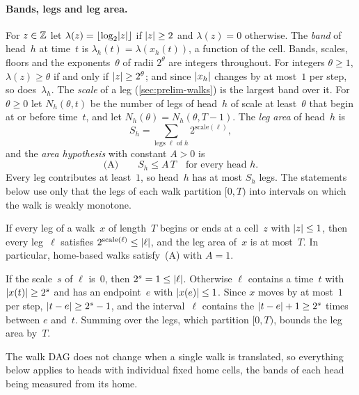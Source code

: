 \paragraph{Bands, legs and leg area.} For $z\in\mathbb{Z}$ let $\lambda(z)=\lfloor\log_2\lvert z \rvert\rfloor$ if $\lvert z \rvert\ge2$ and
$\lambda(z)=0$ otherwise. The \emph{band} of head~$h$ at time~$t$ is $\lambda_h(t)=\lambda(x_h(t))$, a function of
the cell. Bands, scales, floors and the exponents~$\theta$ of radii $2^\theta$ are integers throughout. For integers
$\theta\ge1$, $\lambda(z)\ge\theta$ if and only if $\lvert z \rvert\ge2^\theta$; and since $\lvert x_h \rvert$ changes by at most~$1$ per
step, so does~$\lambda_h$. The \emph{scale} of a leg (\cref{sec:prelim-walks}) is the largest band over it. For
$\theta\ge0$ let $N_h(\theta,t)$ be the number of legs of head~$h$ of scale at least~$\theta$ that begin at or before
time~$t$, and let $N_h(\theta)=N_h(\theta,T-1)$. The \emph{leg area} of head~$h$ is
\[
  S_h=\sum_{\text{legs $\ell$ of $h$}}2^{\mathrm{scale}(\ell)},
\]
and the \emph{area hypothesis} with constant $A>0$ is
\[
  \text{(A)}\qquad S_h\le A\,T\quad\text{for every head }h.
\]
Every leg contributes at least~$1$, so head~$h$ has at most $S_h$ legs. The statements below use only that the legs
of each walk partition $[0,T)$ into intervals on which the walk is weakly monotone.

\begin{lemma}\label{lem:dec-area}
\notformalized
If every leg of a walk~$x$ of length~$T$ begins or ends at a cell~$z$ with $\lvert z \rvert\le1$, then every leg~$\ell$
satisfies $2^{\mathrm{scale}(\ell)}\le\lvert \ell \rvert$, and the leg area of~$x$ is at most~$T$. In particular, home-based
walks satisfy~(A) with $A=1$.
\end{lemma}

\begin{informalproof}
If the scale~$s$ of $\ell$ is~$0$, then $2^s=1\le\lvert \ell \rvert$. Otherwise $\ell$ contains a time~$t$ with
$\lvert x(t) \rvert\ge2^s$ and has an endpoint~$e$ with $\lvert x(e) \rvert\le1$. Since $x$ moves by at most~$1$ per step,
$\lvert t-e \rvert\ge2^s-1$, and the interval~$\ell$ contains the $\lvert t-e \rvert+1\ge2^s$ times between $e$ and~$t$. Summing
over the legs, which partition $[0,T)$, bounds the leg area by~$T$.
\end{informalproof}

The walk DAG does not change when a single walk is translated, so everything below applies to heads with individual
fixed home cells, the bands of each head being measured from its home.

